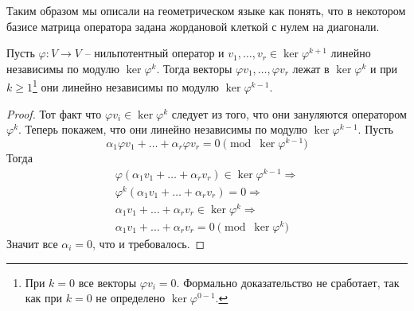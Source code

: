 Таким образом мы описали на геометрическом языке как понять, что в некотором базисе матрица оператора задана жордановой клеткой с нулем на диагонали.

\begin{claim}\label{claim::LinIndepModKer}
Пусть $\varphi\colon V\to V$ -- нильпотентный оператор и $v_1,\ldots,v_r\in \ker \varphi^{k+1}$ линейно независимы по модулю $\ker \varphi^k$. Тогда векторы $\varphi v_1,\ldots,\varphi v_r$ лежат в $\ker \varphi^k$ и при $k \geqslant 1$\footnote{При $k = 0$ все векторы $\varphi v_i = 0$. Формально доказательство не сработает, так как при $k = 0$ не определено $\ker \varphi^{0 - 1}$.} они линейно независимы по модулю $\ker \varphi^{k-1}$.
\end{claim}
\begin{proof}
Тот факт что $\varphi v_i\in \ker \varphi^{k}$ следует из того, что они зануляются оператором $\varphi^k$. Теперь покажем, что они линейно независимы по модулю $\ker \varphi^{k-1}$. Пусть 
\[
\alpha_1 \varphi v_1 + \ldots + \alpha_r \varphi v_r = 0 \pmod{\ker \varphi^{k-1}}
\]
Тогда
\begin{gather*}
\varphi(\alpha_1 v_1 + \ldots + \alpha_r v_r)\in \ker \varphi^{k-1}\Rightarrow\\
\varphi^k(\alpha_1 v_1 + \ldots + \alpha_r v_r) = 0\Rightarrow\\
\alpha_1v_1 +\ldots + \alpha_r v_r \in \ker\varphi^k\Rightarrow\\
\alpha_1 v_1 + \ldots + \alpha_r v_r = 0 \pmod{\ker \varphi^k}
\end{gather*}
Значит все $\alpha_i = 0$, что и требовалось.
\end{proof}

